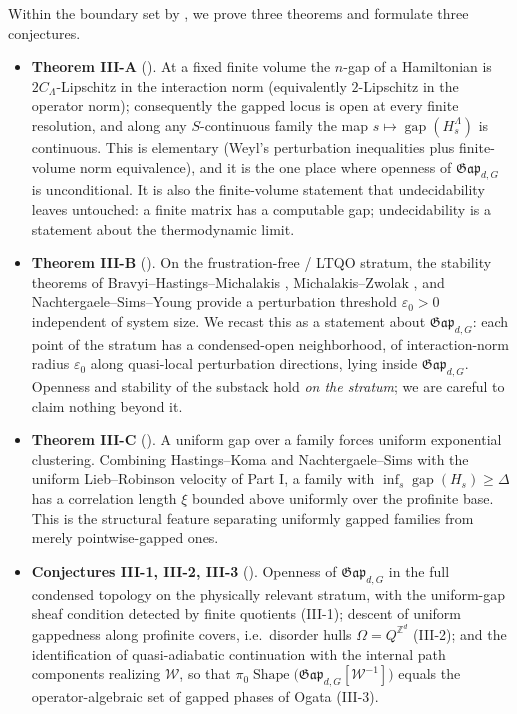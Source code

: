 \documentclass[12pt]{article}
\newcommand{\Shape}{\operatorname{Shape}}      %
\newcommand{\Gap}{\mathfrak{Gap}}              %
\newcommand{\Weq}{\mathcal{W}}                 %
\newcommand{\gapof}[1]{\operatorname{gap}(#1)} %
\newcommand{\gapbound}{\Delta}                  %
\newcommand{\dis}{\Omega}                       %
\newcommand{\Z}{\mathbb{Z}}
\DeclareMathOperator*{\einf}{inf}
\theoremstyle{plain}
\theoremstyle{definition}
\theoremstyle{remark}
\begin{document}
Within the boundary set by , we prove three theorems and
formulate three conjectures.

\begin{itemize}
\item \textbf{Theorem III-A} (). At a fixed finite volume the
$n$-gap of a Hamiltonian is $2C_\Lambda$-Lipschitz in the interaction norm (equivalently $2$-Lipschitz in the operator norm); consequently the
gapped locus is open at every finite resolution, and along any $S$-continuous family
the map $s\mapsto\gapof{H_s^{\Lambda}}$ is continuous. This is elementary (Weyl's
perturbation inequalities plus finite-volume norm equivalence), and it is the one
place where openness of $\Gap_{d,G}$ is unconditional. It is also the finite-volume
statement that undecidability leaves untouched: a finite matrix has a computable gap;
undecidability is a statement about the thermodynamic limit.

\item \textbf{Theorem III-B} (). On the frustration-free / LTQO
stratum, the stability theorems of Bravyi--Hastings--Michalakis
\cite{bhm-stability,bravyi-hastings-shortproof}, Michalakis--Zwolak
\cite{michalakis-zwolak}, and Nachtergaele--Sims--Young \cite{nsy-bulkgap} provide a
perturbation threshold $\varepsilon_0>0$ independent of system size. We recast this
as a statement about $\Gap_{d,G}$: each point of the stratum has a condensed-open
neighborhood, of interaction-norm radius $\varepsilon_0$ along quasi-local
perturbation directions, lying inside $\Gap_{d,G}$. Openness and stability of the
substack hold \emph{on the stratum}; we are careful to claim nothing beyond it.

\item \textbf{Theorem III-C} (). A uniform gap over a family
forces uniform exponential clustering. Combining Hastings--Koma \cite{hastings-koma}
and Nachtergaele--Sims \cite{nachtergaele-sims-clustering} with the uniform
Lieb--Robinson velocity of Part I, a family with $\einf_s\gapof{H_s}\ge\gapbound$ has
a correlation length $\xi$ bounded above uniformly over the profinite base. This is
the structural feature separating uniformly gapped families from merely
pointwise-gapped ones.

\item \textbf{Conjectures III-1, III-2, III-3} (). Openness of
$\Gap_{d,G}$ in the full condensed topology on the physically relevant stratum, with
the uniform-gap sheaf condition detected by finite quotients (III-1); descent of
uniform gappedness along profinite covers, i.e.\ disorder hulls $\dis=Q^{\Z^d}$
(III-2); and the identification of quasi-adiabatic continuation with the internal
path components realizing $\Weq$, so that
$\pi_0\Shape\!\big(\Gap_{d,G}[\Weq^{-1}]\big)$ equals the operator-algebraic set of
gapped phases of Ogata \cite{ogata-classification-review} (III-3).
\end{itemize}
\end{document}
